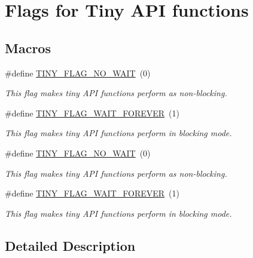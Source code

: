 \hypertarget{group__FLAGS__GROUP}{}\section{Flags for Tiny A\+P\+I functions}
\label{group__FLAGS__GROUP}
\subsection*{Macros}
\begin{DoxyCompactItemize}
\item 
\hypertarget{group__FLAGS__GROUP_gadadd60eb21d7949e6d097ad36aab9b2e}{}\#define \hyperlink{group__FLAGS__GROUP_gadadd60eb21d7949e6d097ad36aab9b2e}{T\+I\+N\+Y\+\_\+\+F\+L\+A\+G\+\_\+\+N\+O\+\_\+\+W\+A\+I\+T}~(0)\label{group__FLAGS__GROUP_gadadd60eb21d7949e6d097ad36aab9b2e}

\begin{DoxyCompactList}\small\item\em This flag makes tiny A\+P\+I functions perform as non-\/blocking. \end{DoxyCompactList}\item 
\hypertarget{group__FLAGS__GROUP_ga3a34267804581c5709d03f52d232b307}{}\#define \hyperlink{group__FLAGS__GROUP_ga3a34267804581c5709d03f52d232b307}{T\+I\+N\+Y\+\_\+\+F\+L\+A\+G\+\_\+\+W\+A\+I\+T\+\_\+\+F\+O\+R\+E\+V\+E\+R}~(1)\label{group__FLAGS__GROUP_ga3a34267804581c5709d03f52d232b307}

\begin{DoxyCompactList}\small\item\em This flag makes tiny A\+P\+I functions perform in blocking mode. \end{DoxyCompactList}\item 
\hypertarget{group__FLAGS__GROUP_gadadd60eb21d7949e6d097ad36aab9b2e}{}\#define \hyperlink{group__FLAGS__GROUP_gadadd60eb21d7949e6d097ad36aab9b2e}{T\+I\+N\+Y\+\_\+\+F\+L\+A\+G\+\_\+\+N\+O\+\_\+\+W\+A\+I\+T}~(0)\label{group__FLAGS__GROUP_gadadd60eb21d7949e6d097ad36aab9b2e}

\begin{DoxyCompactList}\small\item\em This flag makes tiny A\+P\+I functions perform as non-\/blocking. \end{DoxyCompactList}\item 
\hypertarget{group__FLAGS__GROUP_ga3a34267804581c5709d03f52d232b307}{}\#define \hyperlink{group__FLAGS__GROUP_ga3a34267804581c5709d03f52d232b307}{T\+I\+N\+Y\+\_\+\+F\+L\+A\+G\+\_\+\+W\+A\+I\+T\+\_\+\+F\+O\+R\+E\+V\+E\+R}~(1)\label{group__FLAGS__GROUP_ga3a34267804581c5709d03f52d232b307}

\begin{DoxyCompactList}\small\item\em This flag makes tiny A\+P\+I functions perform in blocking mode. \end{DoxyCompactList}\end{DoxyCompactItemize}


\subsection{Detailed Description}
